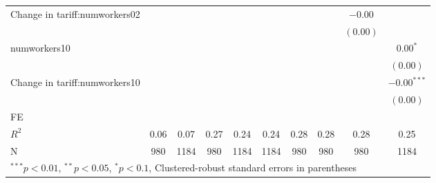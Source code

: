 \begin{tabular}{l c c c c c c c c c }
Change in tariff:numworkers02 &              &              &              &              &              &              &              & $-0.00$      &               \\
                     &              &              &              &              &              &              &              & $(0.00)$     &               \\
numworkers10         &              &              &              &              &              &              &              &              & $0.00^{*}$    \\
                     &              &              &              &              &              &              &              &              & $(0.00)$      \\
Change in tariff:numworkers10 &              &              &              &              &              &              &              &              & $-0.00^{***}$ \\
                     &              &              &              &              &              &              &              &              & $(0.00)$      \\
\hline
FE          &                &                &                &                &                &                &                &                &                \\ 
\hline
$R^2$                & 0.06         & 0.07         & 0.27         & 0.24         & 0.24         & 0.28         & 0.28         & 0.28         & 0.25          \\
N                    & 980          & 1184         & 980          & 1184         & 1184         & 980          & 980          & 980          & 1184          \\
\hline
\multicolumn{10}{l}{\scriptsize{$^{***}p<0.01$, $^{**}p<0.05$, $^*p<0.1$, Clustered-robust standard errors in parentheses}}
\end{tabular}
